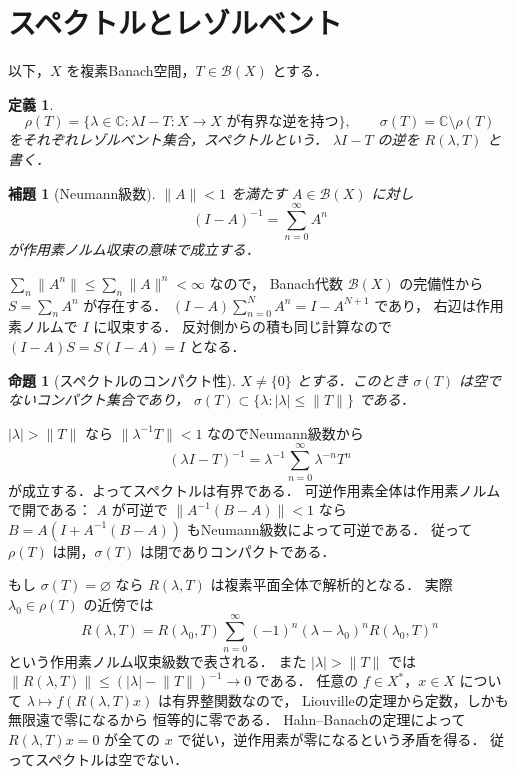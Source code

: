\documentclass[a5paper,10pt,onecolumn]{jsarticle}
\makeatletter
\theoremstyle{mathnotetheorem}
\newtheorem{definition}[theorem]{定義}
\newtheorem{lemma}[theorem]{補題}
\newtheorem{proposition}[theorem]{命題}
\renewcommand{\proofname}{証明}
\renewenvironment{proof}[1][\proofname]{%
  \par\pushQED{\qed}\normalfont\topsep4\p@\@plus2\p@\relax
  \trivlist\item[\hskip\labelsep\bfseries #1]\ignorespaces
}{\popQED\endtrivlist\@endpefalse}
\newcommand{\norm}[1]{\lVert #1\rVert}
\makeatother
\begin{document}
\section{スペクトルとレゾルベント}

以下，$X$ を複素Banach空間，$T\in\mathcal B(X)$ とする．
\begin{definition}
\[
 \rho(T)=\{\lambda\in\mathbb C:
  \lambda I-T:X\to X\text{ が有界な逆を持つ}\},
 \qquad \sigma(T)=\mathbb C\setminus\rho(T)
\]
をそれぞれレゾルベント集合，スペクトルという．
$\lambda I-T$ の逆を $R(\lambda,T)$ と書く．
\end{definition}

\begin{lemma}[Neumann級数]\label{lem:neumann}
$\norm A<1$ を満たす $A\in\mathcal B(X)$ に対し
\[
 (I-A)^{-1}=\sum_{n=0}^\infty A^n
\]
が作用素ノルム収束の意味で成立する．
\end{lemma}
\begin{proof}
$\sum_n\norm{A^n}\le\sum_n\norm A^n<\infty$ なので，
Banach代数 $\mathcal B(X)$ の完備性から
$S=\sum_nA^n$ が存在する．
$(I-A)\sum_{n=0}^NA^n=I-A^{N+1}$ であり，
右辺は作用素ノルムで $I$ に収束する．
反対側からの積も同じ計算なので
$(I-A)S=S(I-A)=I$ となる．
\end{proof}

\begin{proposition}[スペクトルのコンパクト性]\label{prop:spectrum}
$X\ne\{0\}$ とする．このとき
$\sigma(T)$ は空でないコンパクト集合であり，
$\sigma(T)\subset\{\lambda:|\lambda|\le\norm T\}$ である．
\end{proposition}
\begin{proof}
$|\lambda|>\norm T$ なら
$\norm{\lambda^{-1}T}<1$ なのでNeumann級数から
\[
 (\lambda I-T)^{-1}
 =\lambda^{-1}\sum_{n=0}^\infty\lambda^{-n}T^n
\]
が成立する．よってスペクトルは有界である．
可逆作用素全体は作用素ノルムで開である：
$A$ が可逆で $\norm{A^{-1}(B-A)}<1$ なら
$B=A(I+A^{-1}(B-A))$ もNeumann級数によって可逆である．
従って $\rho(T)$ は開，$\sigma(T)$ は閉でありコンパクトである．

もし $\sigma(T)=\varnothing$ なら
$R(\lambda,T)$ は複素平面全体で解析的となる．
実際 $\lambda_0\in\rho(T)$ の近傍では
\[
 R(\lambda,T)
 =R(\lambda_0,T)
  \sum_{n=0}^\infty
  (-1)^n(\lambda-\lambda_0)^nR(\lambda_0,T)^n
\]
という作用素ノルム収束級数で表される．
また $|\lambda|>\norm T$ では
$\norm{R(\lambda,T)}\le(|\lambda|-\norm T)^{-1}\to0$ である．
任意の $f\in X^*$，$x\in X$ について
$\lambda\mapsto f(R(\lambda,T)x)$ は有界整関数なので，
Liouvilleの定理から定数，しかも無限遠で零になるから
恒等的に零である．
Hahn--Banachの定理によって $R(\lambda,T)x=0$
が全ての $x$ で従い，逆作用素が零になるという矛盾を得る．
従ってスペクトルは空でない．
\end{proof}
\end{document}
